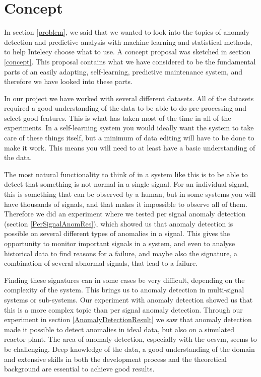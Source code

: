 \documentclass[english, a4paper]{report}
\begin{document}
{    \section{Concept}\label{conceptDiscussion}
    {
        In section \ref{problem}, we said that we wanted to look into the topics of anomaly detection and predictive analysis with machine learning and statistical methods, to help Intelecy choose what to use. A concept proposal was sketched in section \ref{concept}. This proposal contains what we have considered to be the fundamental parts of an easily adapting, self-learning, predictive maintenance system, and therefore we have looked into these parts.
        \par 
        In our project we have worked with several different datasets. All of the datasets required a good understanding of the data to be able to do pre-processing and select good features. This is what has taken most of the time in all of the experiments. In a self-learning system you would ideally want the system to take care of these things itself, but a minimum of data editing will have to be done to make it work. This means you will need to at least have a basic understanding of the data. 
        \par 
        The most natural functionality to think of in a system like this is to be able to detect that something is not normal in a single signal. For an individual signal, this is something that can be observed by a human, but in some systems you will have thousands of signals, and that makes it impossible to observe all of them. Therefore we did an experiment where we tested per signal anomaly detection (section \ref{PerSignalAnomRes}), which showed us that anomaly detection is possible on several different types of anomalies in a signal. This gives the opportunity to monitor important signals in a system, and even to analyse historical data to find reasons for a failure, and maybe also the signature, a combination of several abnormal signals, that lead to a failure.
        \par 
        Finding these signatures can in some cases be very difficult, depending on the complexity of the system. This brings us to anomaly detection in multi-signal systems or sub-systems. Our experiment with anomaly detection showed us that this is a more complex topic than per signal anomaly detection. Through our experiment in section \ref{AnomalyDetectionResult} we saw that anomaly detection made it possible to detect anomalies in ideal data, but also on a simulated reactor plant. The area of anomaly detection, especially with the \gls{ocsvm}, seems to be challenging. Deep knowledge of the data, a good understanding of the domain and extensive skills in both the development process and the theoretical background are essential to achieve good results.
}}
\end{document}
